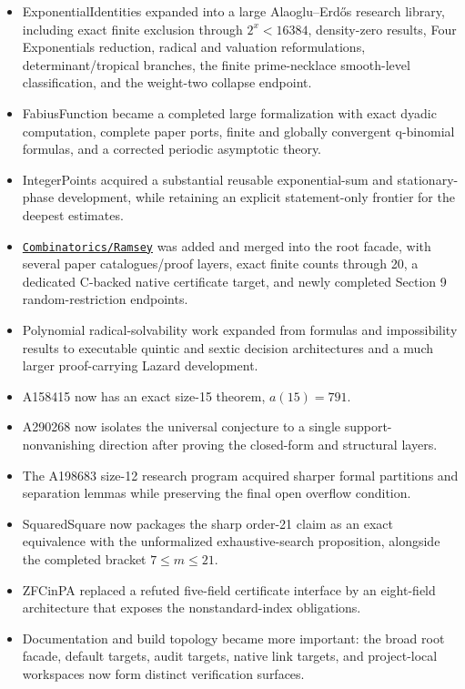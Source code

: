 \documentclass[
  10pt,
  a4paper,
  twoside,
  open=any,
  parskip=half,
  headings=big
]{scrreprt}
\newcommand{\CommitFull}{56a402bf82a9aab119fcbe3e96b991d387b221c5}
\newcommand{\RepoWeb}{https://github.com/VladimirReshetnikov/ProveIt}
\newcommand{\RepoTreeBase}{\RepoWeb/tree/\CommitFull}
\newcommand{\project}[1]{\textsf{#1}}
\newcommand{\RepoDir}[1]{\href{\RepoTreeBase/#1}{\nolinkurl{#1}}}
\begin{document}
\begin{itemize}
  \item \project{ExponentialIdentities} expanded into a large Alaoglu--Erd\H{o}s research library, including exact finite exclusion through $2^x<16384$, density-zero results, Four Exponentials reduction, radical and valuation reformulations, determinant/tropical branches, the finite prime-necklace smooth-level classification, and the weight-two collapse endpoint.
  \item \project{FabiusFunction} became a completed large formalization with exact dyadic computation, complete paper ports, finite and globally convergent q-binomial formulas, and a corrected periodic asymptotic theory.
  \item \project{IntegerPoints} acquired a substantial reusable exponential-sum and stationary-phase development, while retaining an explicit statement-only frontier for the deepest estimates.
  \item \RepoDir{Combinatorics/Ramsey} was added and merged into the root facade, with several paper catalogues/proof layers, exact finite counts through 20, a dedicated C-backed native certificate target, and newly completed Section 9 random-restriction endpoints.
  \item Polynomial radical-solvability work expanded from formulas and impossibility results to executable quintic and sextic decision architectures and a much larger proof-carrying Lazard development.
  \item A158415 now has an exact size-15 theorem, $a(15)=791$.
  \item A290268 now isolates the universal conjecture to a single support-nonvanishing direction after proving the closed-form and structural layers.
  \item The A198683 size-12 research program acquired sharper formal partitions and separation lemmas while preserving the final open overflow condition.
  \item SquaredSquare now packages the sharp order-21 claim as an exact equivalence with the unformalized exhaustive-search proposition, alongside the completed bracket $7\leq m\leq21$.
  \item ZFCinPA replaced a refuted five-field certificate interface by an eight-field architecture that exposes the nonstandard-index obligations.
  \item Documentation and build topology became more important: the broad root facade, default targets, audit targets, native link targets, and project-local workspaces now form distinct verification surfaces.
\end{itemize}
\end{document}
